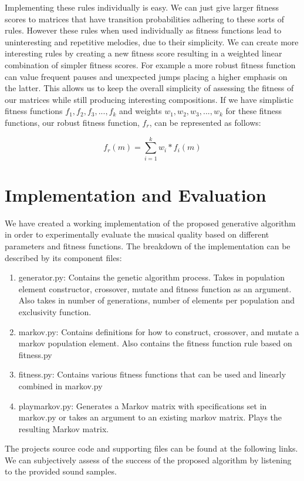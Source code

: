 \documentclass{article}
\begin{document}
Implementing these rules individually is easy. We can just give larger fitness scores to matrices that have transition probabilities adhering to these sorts of rules. However these rules when used individually as fitness functions lead to uninteresting and repetitive melodies, due to their simplicity. We can create more interesting rules by creating a new fitness score resulting in a weighted linear combination of simpler fitness scores. For example a more robust fitness function can value frequent pauses and unexpected jumps placing a higher emphasis on the latter.  This allows us to keep the overall simplicity of assessing the fitness of our matrices while still producing interesting compositions. If we have simplistic fitness functions $f_1, f_2, f_3, ..., f_k$ and weights $w_1, w_2, w_3, ..., w_k$ for these fitness functions, our robust fitness function, $f_r$, can be represented as follows:

\[
f_r(m) = \sum_{i = 1}^k{w_i * f_i (m)}
\]

\section{Implementation and Evaluation}

We have created a working implementation of the proposed generative algorithm in order to experimentally evaluate the musical quality based on different parameters and fitness functions. The breakdown of the implementation can be described by its component files:

\begin{enumerate}
\item generator.py: Contains the genetic algorithm process. Takes in population element constructor, crossover, mutate and fitness function as an argument. Also takes in number of generations, number of elements per population and exclusivity function.
\item markov.py: Contains definitions for how to construct, crossover, and mutate a markov population element. Also contains the fitness function rule based on fitness.py
\item fitness.py: Contains various fitness functions that can be used and linearly combined in markov.py
\item playmarkov.py: Generates a Markov matrix with specifications set in markov.py or takes an argument to an existing markov matrix. Plays the resulting Markov matrix.
\end{enumerate}

The projects source code and supporting files can be found at the following links. We can subjectively assess of the success of the proposed algorithm by listening to the provided sound samples.
\end{document}
